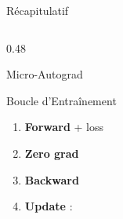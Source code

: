 \documentclass[aspectratio=169, 10pt]{beamer}
\begin{document}
\begin{frame}{Récapitulatif}
\begin{columns}[T]
\begin{column}{0.48\textwidth}
\begin{alertblock}{Micro-Autograd}
      \end{alertblock}
      \smallskip
      \begin{block}{Boucle d'Entraînement}
        \small\begin{enumerate}
          \item \textbf{Forward} + loss
          \item \textbf{Zero grad}
          \item \textbf{Backward}
          \item \textbf{Update} : 
        \end{enumerate}
      \end{block}
    \end{column}
  \end{columns}
\end{frame}
\end{document}
